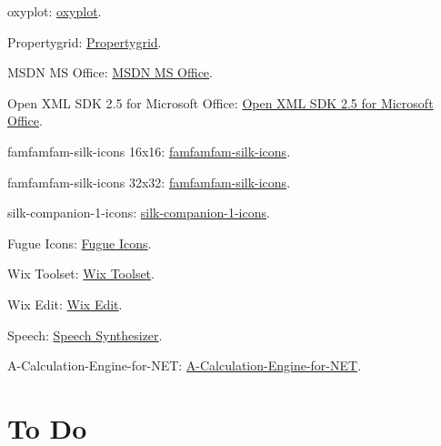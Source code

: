 	oxyplot: \href{http://oxyplot.codeplex.com/}{oxyplot}.
	
	Propertygrid:  \href{http://www.codeproject.com/Articles/27326/Load-and-Save-Data-Using-PropertyGrid?q=Load+and+Save+Data+Using+PropertyGrid}{Propertygrid}.
	
	
	MSDN MS Office: \href{http://msdn.microsoft.com/en-us/library/office/}{MSDN MS Office}.
	
	Open XML SDK 2.5 for Microsoft Office: \href{http://www.microsoft.com/en-us/download/details.aspx?id=30425}{Open XML SDK 2.5 for Microsoft Office}.
	
	famfamfam-silk-icons 16x16: \href{http://www.famfamfam.com/lab/icons/silk/}{famfamfam-silk-icons}.
	
	famfamfam-silk-icons 32x32: \href{http://www.iconarchive.com/show/farm-fresh-icons-by-fatcow.html}{famfamfam-silk-icons}.
	
	
	
	silk-companion-1-icons: \href{http://damieng.com/creative/icons/silk-companion-1-icons}{silk-companion-1-icons}.
	
	Fugue Icons: \href{http://p.yusukekamiyamane.com/}{Fugue Icons}.
	
	Wix Toolset: \href{http://wixtoolset.org/}{Wix Toolset}.
	
	Wix Edit: \href{http://wixedit.sourceforge.net/}{Wix Edit}.
	
	Speech: \href{http://www.codeproject.com/Articles/28725/A-Very-Easy-Introduction-to-Microsoft-NET-Speech-S}{Speech Synthesizer}.
	
	
	A-Calculation-Engine-for-NET: \href{http://www.codeproject.com/Articles/246374/A-Calculation-Engine-for-NET}{A-Calculation-Engine-for-NET}. 
	
	
	
	
	
	\newpage
	\section{To Do}
	
